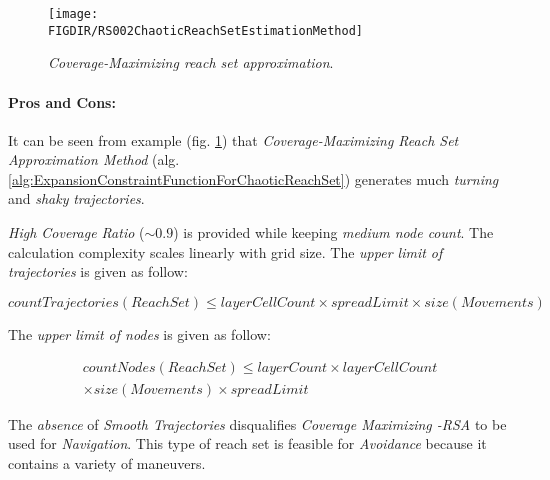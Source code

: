 \begin{figure}[H]
    \centering
    \texttt{[image: \\FIGDIR/RS002ChaoticReachSetEstimationMethod]} 
    \caption{\emph{Coverage-Maximizing \emph{reach set} approximation}.}
    \label{fig:chaoticReachSetApproximation}
\end{figure}


\paragraph{Pros and Cons:} It can be seen from example (fig. \ref{fig:chaoticReachSetApproximation}) that \emph{Coverage-Maximizing Reach Set Approximation Method} (alg. \ref{alg:ExpansionConstraintFunctionForChaoticReachSet}) generates much \emph{turning} and \emph{shaky} \emph{trajectories}. 

\emph{High Coverage Ratio} ($\sim 0.9$) is provided while keeping \emph{medium node count}. The calculation complexity scales linearly with grid size. The \emph{upper limit of trajectories} is given as follow:

\begin{equation}
    countTrajectories(ReachSet) \le layerCellCount \times spreadLimit \times size(Movements)
\end{equation}

\noindent The \emph{upper limit of nodes} is given as follow:
    
\begin{multline}
    countNodes(ReachSet) \le layerCount \times  layerCellCount  \\
    \times size(Movements) \times spreadLimit  
\end{multline}

\noindent The \emph{absence} of \emph{Smooth Trajectories} disqualifies \emph{Coverage Maximizing -RSA} to be used for \emph{Navigation}. This type of reach set is feasible for \emph{Avoidance} because it contains a variety of maneuvers.



